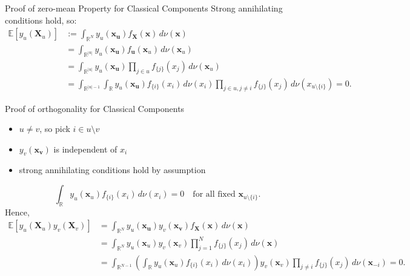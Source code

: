 \begin{frame}{Proof of zero-mean Property for Classical Components}
  Strong annihilating conditions hold, so:
  \begin{align*}
    \mathbb{E}[y_u(\boldsymbol{X}_u)] &:= \int_{\mathbb{R}^{N}} y_u(\boldsymbol{x_u}) f_{\boldsymbol{X}}(\boldsymbol{x}) \, d\nu (\boldsymbol{x}) \\[0.5em]
    &= \int_{\mathbb{R}^{|u|}} y_u(\boldsymbol{x_u}) f_{\boldsymbol{u}}(\boldsymbol{x}_u) \, d\nu (\boldsymbol{x}_u) \\[0.5em]
    &= \int_{\mathbb{R}^{|u|}} y_u(\boldsymbol{x_u}) \prod_{j \in u} f_{\{j\}}(x_j) \, d\nu (\boldsymbol{x}_u) \\[0.5em]
    &= \int_{\mathbb{R}^{|u|-1}} \int_{\mathbb{R}} y_u(\boldsymbol{x_u}) f_{\{i\}}(x_i) \, d\nu(x_i) \prod_{j \in u, j \neq i} f_{\{j\}}(x_j) \, d\nu (x_{u \setminus \{i\}}) = 0.
\end{align*}

\end{frame}

\begin{frame}{Proof of orthogonality for Classical Components}
  \begin{itemize}
    \item $u \neq v$, so pick $i \in u \setminus v$
    \item $y_v(\boldsymbol{x_v})$ is independent of $x_i$
    \item strong annihilating conditions hold by assumption
  \end{itemize}
\[
    \int_{\mathbb{R}} y_u(\boldsymbol{x}_u) f_{\{i\}}(x_i)\,d\nu(x_i) = 0
    \quad \text{for all fixed } \boldsymbol{x}_{u\setminus \{i\}}.
\]
Hence,
\begin{align*}
    \mathbb{E}[y_u(\boldsymbol{X}_u) y_v(\boldsymbol{X}_v)] &= \int_{\mathbb{R}^{N}} y_u(\boldsymbol{x_u}) y_v(\boldsymbol{x_v}) f_{\boldsymbol{X}}(\boldsymbol{x}) \, d\nu (\boldsymbol{x}) \\
    &= \int_{\mathbb{R}^{N}} y_u(\boldsymbol{x}_u) y_v(\boldsymbol{x}_v)
       \prod_{j=1}^N f_{\{j\}}(x_j)\, d\nu(\boldsymbol{x}) \\
    &= \int_{\mathbb{R}^{N-1}}
        \left(\int_{\mathbb{R}} y_u(\boldsymbol{x}_u) f_{\{i\}}(x_i)\,d\nu(x_i)\right)
        y_v(\boldsymbol{x}_v)\prod_{j \neq i} f_{\{j\}}(x_j)\,d\nu(\boldsymbol{x}_{-i}) = 0.
\end{align*}
\end{frame}

